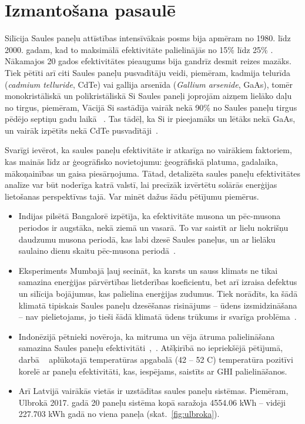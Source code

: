 \section{Izmantošana pasaulē}

Silīcija Saules paneļu attīstības intensīvākais posms bija apmēram no 1980. līdz 2000. gadam, kad to maksimālā efektivitāte palielinājās no 15\% līdz 25\%
\cite{Sivaram}. Nākamajos 20 gados efektivitātes pieaugums bija gandrīz desmit reizes mazāks. Tiek pētīti arī citi Saules paneļu pusvadītāju veidi, piemēram, kadmija telurīda (\textit{cadmium telluride}, CdTe) vai gallija arsenīda (\textit{Gallium arsenide}, GaAs), tomēr monokristāliskā un polikristāliskā Si Saules paneļi joprojām aizņem lielāko daļu no tirgus, piemēram, Vācijā Si sastādīja vairāk nekā 90\% no Saules paneļu tirgus pēdējo septiņu gadu laikā ~\cite{prognoze}. Tas tādēļ, ka Si ir pieejamāks un lētāks nekā GaAs\cite{hayes_clemens_2015}, un vairāk izpētīts nekā CdTe pusvadītāji~\cite{Sivaram}.

Svarīgi ievērot, ka saules paneļu efektivitāte ir atkarīga no vairākiem faktoriem, kas mainās līdz ar ģeogrāfisko novietojumu: ģeogrāfiskā platuma, gadalaika, mākoņainības un gaisa piesārņojuma. Tātad, detalizēta saules paneļu efektivitātes analīze var būt noderīga katrā valstī, lai precīzāk izvērtētu solārās enerģijas lietošanas perspektīvas tajā. Var minēt dažus šādu pētījumu piemērus.
\begin{itemize}
  \item Indijas pilsētā Bangalorē izpētīja, ka efektivitāte musona un pēc-musona periodos ir augstāka, nekā ziemā un vasarā. To var saistīt ar lielu nokrišņu daudzumu musona periodā, kas labi dzesē Saules paneļus, un ar lielāku saulaino dienu skaitu pēc-musona periodā~\cite{effectCloudsOnSurface}.
  \item Eksperiments Mumbajā ļauj secināt, ka karsts un sauss klimats ne tikai samazina enerģijas pārvērtības lietderības koeficientu, bet arī izraisa defektus un silīcija bojājumus, kas palielina enerģijas zudumus. Tiek norādīts, ka šādā klimatā tipiskais Saules paneļu dzesēšanas risinājums -- ūdens izsmidzināšana -- nav pielietojams, jo tieši šādā klimatā ūdens trūkums ir svarīga problēma~\cite{improvePerformance}.
  \item Indonēzijā pētnieki novēroja, ka mitruma un vēja ātruma palielināšana samazina Saules paneļu efektivitāti~\cite{improvePerformance},~\cite{Sani_2018}. Atšķirībā no iepriekšējā pētījumā, darbā ~\cite{Sani_2018} aplūkotajā temperatūras apgabalā (42 -- 52 \textdegree C) temperatūra pozitīvi korelē ar paneļu efektivitāti, kas, iespējams, saistīts ar GHI palielināšanos. 
  \item Arī Latvijā vairākās vietās ir uzstādītas saules paneļu sistēmas. Piemēram, Ulbrokā 2017. gadā 20 paneļu sistēma kopā saražoja 4554.06 kWh -- vidēji 227.703 kWh gadā no viena paneļa (skat.~\ref{fig:ulbroka}).
\end{itemize}


